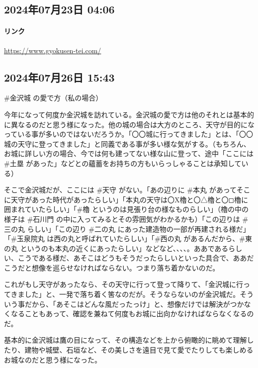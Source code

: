 \documentclass[facebook_diary.tex]{subfiles}
\begin{document}
\subsection*{2024年07月23日 04:06}

\paragraph{リンク}
\url{https://www.gyokusen-tei.com/}

\subsection*{2024年07月26日 15:43}

\#金沢城 の愛で方（私の場合）


今年になって何度か金沢城を訪れている。金沢城の愛で方は他のそれとは基本的に異なるのだと思う様になった。他の城の場合は大方のところ、天守が目的になっている事が多いのではないだろうか。「〇〇城に行ってきました」とは、「〇〇城の天守に登ってきました」と同義である事が多い様な気がする。（もちろん、お城に詳しい方の場合、今では何も建ってない様な山に登って、途中「ここには \#土塁 があった」などとの蘊蓄をお持ちの方もいらっしゃることは承知している）

そこで金沢城だが、ここには \#天守 がない。「あの辺りに \#本丸 があってそこに天守があった時代があったらしい」「本丸の天守は〇X櫓と〇△櫓と〇◻︎櫓に囲まれていたらしい」「\#櫓 というのは見張り台の様なものらしい」（櫓の中の様子は \#石川門 の中に入ってみるとその雰囲気がわかるかも）「この辺りは \#三の丸 らしい」「この辺り \#二の丸 にあった建造物の一部が再建される様だ」「\#玉泉院丸 は西の丸と呼ばれていたらしい」「\#西の丸 があるんだから、\#東の丸 というのも本丸の近くにあったらしい」などなど、、、、。ああであるらしい、こうである様だ、あそこはどうもそうだったらしいといった具合で、ああだこうだと想像を巡らせなければならない。つまり落ち着かないのだ。

これがもし天守があったなら、その天守に行って登って降りて、「金沢城に行ってきました」と、一発で落ち着く筈なのだが。そうならないのが金沢城だ。そういう事だから、「あそこはどんな風だったっけ」と、想像だけでは解決がつかなくなることもあって、確認を兼ねて何度もお城に出向かなければならなくなるのだ。

基本的に金沢城は鷹の目になって、その構造などを上から俯瞰的に眺めて理解したり、建物や城壁、石垣など、その美しさを遠目で見て愛でたりしても楽しめるお城なのだと思う様になった。
\end{document}
